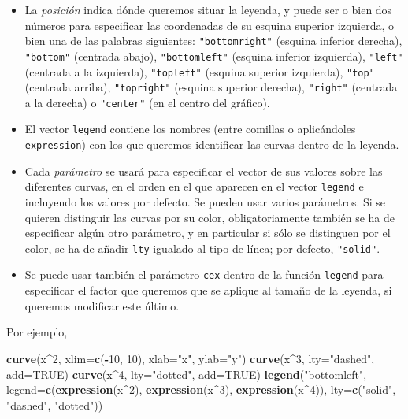 \documentclass[
]{book}
\newenvironment{Shaded}{\begin{snugshade}}{\end{snugshade}}
\newcommand{\DataTypeTok}[1]{\textcolor[rgb]{0.13,0.29,0.53}{#1}}
\newcommand{\DecValTok}[1]{\textcolor[rgb]{0.00,0.00,0.81}{#1}}
\newcommand{\KeywordTok}[1]{\textcolor[rgb]{0.13,0.29,0.53}{\textbf{#1}}}
\newcommand{\NormalTok}[1]{#1}
\newcommand{\OperatorTok}[1]{\textcolor[rgb]{0.81,0.36,0.00}{\textbf{#1}}}
\newcommand{\OtherTok}[1]{\textcolor[rgb]{0.56,0.35,0.01}{#1}}
\newcommand{\StringTok}[1]{\textcolor[rgb]{0.31,0.60,0.02}{#1}}
\theoremstyle{definition}
\theoremstyle{definition}
\theoremstyle{definition}
\theoremstyle{remark}
\begin{document}
\begin{itemize}
\item
  La \emph{posición} indica dónde queremos situar la leyenda, y puede ser o bien dos números para especificar las coordenadas de su esquina superior izquierda, o bien una de las palabras siguientes: \verb+"bottomright"+ (esquina inferior derecha), \texttt{"bottom"} (centrada abajo), \texttt{"bottomleft"} (esquina inferior izquierda), \texttt{"left"} (centrada a la izquierda), \texttt{"topleft"} (esquina superior izquierda), \texttt{"top"} (centrada arriba), \texttt{"topright"} (esquina superior derecha), \texttt{"right"} (centrada a la derecha) o \texttt{"center"} (en el centro del gráfico).
\item
  El vector \texttt{legend} contiene los nombres (entre comillas o aplicándoles \texttt{expression}) con los que queremos identificar las curvas dentro de la leyenda.
\item
  Cada \emph{parámetro} se usará para especificar el vector de sus valores sobre las diferentes curvas, en el orden en el que aparecen en el vector \texttt{legend} e incluyendo los valores por defecto. Se pueden usar varios parámetros. Si se quieren distinguir las curvas por su color, obligatoriamente también se ha de especificar algún otro parámetro, y en particular si sólo se distinguen por el color, se ha de añadir \texttt{lty} igualado al tipo de línea; por defecto, \texttt{"solid"}.
\item
  Se puede usar también el parámetro \texttt{cex} dentro de la función \texttt{legend} para especificar el factor que queremos que se aplique al tamaño de la leyenda, si queremos modificar este último.
\end{itemize}

Por ejemplo,

\begin{Shaded}
\begin{Highlighting}[]
\KeywordTok{curve}\NormalTok{(x}\OperatorTok{\^{}}\DecValTok{2}\NormalTok{, }\DataTypeTok{xlim=}\KeywordTok{c}\NormalTok{(}\OperatorTok{{-}}\DecValTok{10}\NormalTok{, }\DecValTok{10}\NormalTok{), }\DataTypeTok{xlab=}\StringTok{"x"}\NormalTok{, }\DataTypeTok{ylab=}\StringTok{"y"}\NormalTok{)}
\KeywordTok{curve}\NormalTok{(x}\OperatorTok{\^{}}\DecValTok{3}\NormalTok{, }\DataTypeTok{lty=}\StringTok{"dashed"}\NormalTok{, }\DataTypeTok{add=}\OtherTok{TRUE}\NormalTok{)}
\KeywordTok{curve}\NormalTok{(x}\OperatorTok{\^{}}\DecValTok{4}\NormalTok{, }\DataTypeTok{lty=}\StringTok{"dotted"}\NormalTok{, }\DataTypeTok{add=}\OtherTok{TRUE}\NormalTok{) }
\KeywordTok{legend}\NormalTok{(}\StringTok{"bottomleft"}\NormalTok{, }\DataTypeTok{legend=}\KeywordTok{c}\NormalTok{(}\KeywordTok{expression}\NormalTok{(x}\OperatorTok{\^{}}\DecValTok{2}\NormalTok{), }\KeywordTok{expression}\NormalTok{(x}\OperatorTok{\^{}}\DecValTok{3}\NormalTok{), }\KeywordTok{expression}\NormalTok{(x}\OperatorTok{\^{}}\DecValTok{4}\NormalTok{)), }
       \DataTypeTok{lty=}\KeywordTok{c}\NormalTok{(}\StringTok{"solid"}\NormalTok{, }\StringTok{"dashed"}\NormalTok{, }\StringTok{"dotted"}\NormalTok{))}
\end{Highlighting}
\end{Shaded}
\end{document}
